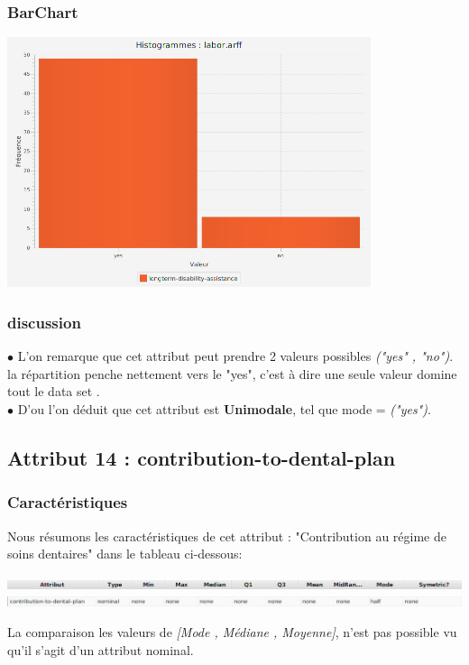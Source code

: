 \documentclass[12pt,a4paper,oneside]{book}
\begin{document}
	\subsubsection{BarChart}
	
	\begin{center}
		\includegraphics[width=0.8\textwidth]{screens/barchart/longterm-disability-assistance-barchart.png}%
		\label{labelname}%
	\end{center}
	
	\subsubsection{discussion}
	$\bullet $ L'on remarque que cet attribut peut prendre 2 valeurs possibles \textit{("yes" , "no")}. la répartition penche nettement vers le "yes", c'est à dire une seule valeur domine tout le data set .\\
	$\bullet $ D'ou l'on déduit que cet attribut est \textbf{Unimodale}, tel que mode = \textit{("yes")}.
	
	\newpage
	
	\subsection{Attribut 14 : contribution-to-dental-plan }
	\subsubsection{Caractéristiques}
	Nous résumons les caractéristiques de cet attribut : "Contribution au régime de soins dentaires" dans le tableau ci-dessous:
	\begin{center}
		\includegraphics[width=1\textwidth]{screens/att.png}\\ \includegraphics[width=1\textwidth]{screens/att-15.png}%
		\label{labelname}%
	\end{center}
	La comparaison les valeurs de \textit{[Mode , Médiane , Moyenne]}, n'est pas possible vu qu'il s'agit d'un attribut nominal.
	
\end{document}
